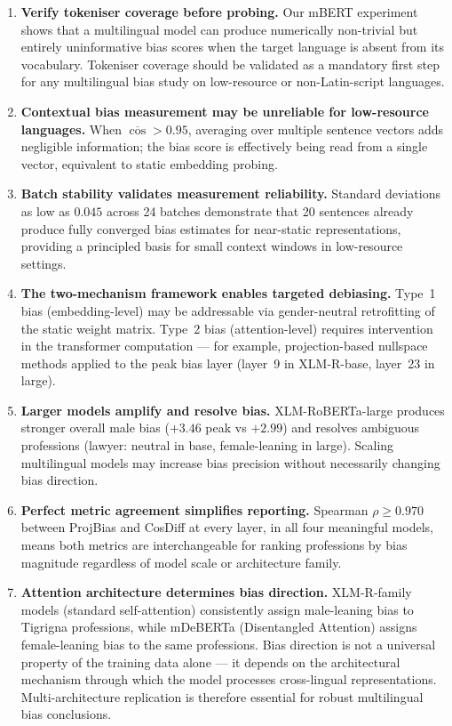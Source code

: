 \documentclass[11pt,a4paper]{article}
\begin{document}
\begin{enumerate}
  \item \textbf{Verify tokeniser coverage before probing.} Our mBERT
    experiment shows that a multilingual model can produce numerically
    non-trivial but entirely uninformative bias scores when the target language
    is absent from its vocabulary. Tokeniser coverage should be validated as a
    mandatory first step for any multilingual bias study on low-resource or
    non-Latin-script languages.

  \item \textbf{Contextual bias measurement may be unreliable for low-resource
    languages.} When $\overline{\cos} > 0.95$, averaging over multiple sentence
    vectors adds negligible information; the bias score is effectively being read
    from a single vector, equivalent to static embedding probing.

  \item \textbf{Batch stability validates measurement reliability.} Standard
    deviations as low as $0.045$ across 24 batches demonstrate that 20
    sentences already produce fully converged bias estimates for near-static
    representations, providing a principled basis for small context windows in
    low-resource settings.

  \item \textbf{The two-mechanism framework enables targeted debiasing.}
    Type~1 bias (embedding-level) may be addressable via gender-neutral
    retrofitting of the static weight matrix. Type~2 bias (attention-level)
    requires intervention in the transformer computation — for example,
    projection-based nullspace methods applied to the peak bias layer (layer~9
    in XLM-R-base, layer~23 in large).

  \item \textbf{Larger models amplify and resolve bias.} XLM-RoBERTa-large
    produces stronger overall male bias ($+3.46$ peak vs $+2.99$) and resolves
    ambiguous professions (lawyer: neutral in base, female-leaning in large).
    Scaling multilingual models may increase bias precision without necessarily
    changing bias direction.

  \item \textbf{Perfect metric agreement simplifies reporting.} Spearman
    $\rho \geq 0.970$ between ProjBias and CosDiff at every layer, in all
    four meaningful models, means both metrics are interchangeable for ranking
    professions by bias magnitude regardless of model scale or architecture
    family.

  \item \textbf{Attention architecture determines bias direction.} XLM-R-family
    models (standard self-attention) consistently assign male-leaning bias to
    Tigrigna professions, while mDeBERTa (Disentangled Attention) assigns
    female-leaning bias to the same professions. Bias direction is not a
    universal property of the training data alone — it depends on the
    architectural mechanism through which the model processes cross-lingual
    representations. Multi-architecture replication is therefore essential for
    robust multilingual bias conclusions.
\end{enumerate}
\end{document}
